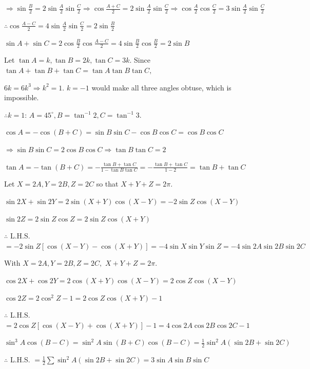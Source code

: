   $\Rightarrow \sin\frac{B}{2} = 2\sin\frac{A}{2}\sin\frac{C}{2} \Rightarrow \cos\frac{A + C}{2} =
  2\sin\frac{A}{2}\sin\frac{C}{2} \Rightarrow \cos\frac{A}{2}\cos\frac{C}{2} = 3\sin\frac{A}{2}\sin\frac{C}{2}$

  $\therefore \cos\frac{A - C}{2} = 4\sin\frac{A}{2}\sin\frac{C}{2} = 2\sin\frac{B}{2}$

  $\sin A + \sin C = 2\cos\frac{B}{2}\cos\frac{A - C}{2} = 4\sin\frac{B}{2}\cos\frac{B}{2} = 2\sin B$

\item Let $\tan A = k, \tan B = 2k, \tan C = 3k$. Since $\tan A + \tan B + \tan C = \tan A\tan B\tan C,$

  $6k = 6k^3 \Rightarrow k^2 = 1$. $k = -1$ would make all three angles obtuse, which is impossible.

  $\therefore k = 1$: $A = 45^\circ, B = \tan^{-1}2, C = \tan^{-1}3$.

\item $\cos A = -\cos(B + C) = \sin B\sin C - \cos B\cos C = \cos B\cos C$

  $\Rightarrow \sin B\sin C = 2\cos B\cos C \Rightarrow \tan B\tan C = 2$

  $\tan A = -\tan(B + C) = -\frac{\tan B + \tan C}{1 - \tan B\tan C} = -\frac{\tan B + \tan C}{1 - 2} = \tan B + \tan C$

\item Let $X = 2A, Y = 2B, Z = 2C$ so that $X + Y + Z = 2\pi$.

  $\sin 2X + \sin 2Y = 2\sin(X + Y)\cos(X - Y) = -2\sin Z\cos(X - Y)$

  $\sin 2Z = 2\sin Z\cos Z = 2\sin Z\cos(X + Y)$

  $\therefore$ L.H.S. $= -2\sin Z[\cos(X - Y) - \cos(X + Y)] = -4\sin X\sin Y\sin Z = -4\sin 2A\sin 2B\sin 2C$

\item With $X = 2A, Y = 2B, Z = 2C,$ $X + Y + Z = 2\pi$.

  $\cos 2X + \cos 2Y = 2\cos(X + Y)\cos(X - Y) = 2\cos Z\cos(X - Y)$

  $\cos 2Z = 2\cos^2Z - 1 = 2\cos Z\cos(X + Y) - 1$

  $\therefore$ L.H.S. $= 2\cos Z[\cos(X - Y) + \cos(X + Y)] - 1 = 4\cos 2A\cos 2B\cos 2C - 1$

\item $\sin^3A\cos(B - C) = \sin^2A\sin(B + C)\cos(B - C) = \frac{1}{2}\sin^2A(\sin 2B + \sin 2C)$

  $\therefore$ L.H.S. $= \frac{1}{2}\sum \sin^2A(\sin 2B + \sin 2C) = 3\sin A\sin B\sin C$

